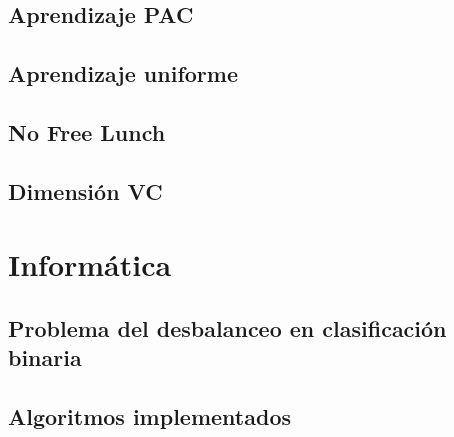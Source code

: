 \documentclass[a4paper,11pt]{report}
\begin{document}
  \chapter{Aprendizaje PAC}
    
  \chapter{Aprendizaje uniforme}
    
  \chapter{No Free Lunch}
    
  \chapter{Dimensión VC}
    
  
\part{Informática}
  \chapter{Problema del desbalanceo en clasificación binaria}
    
  \chapter{Algoritmos implementados}
    


% 
%

\end{document}
